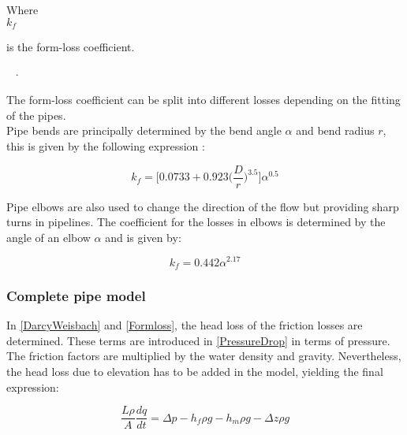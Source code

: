  \begin{minipage}[t]{0.20\textwidth}
Where\\
\hspace*{8mm} $k_f$ 
\end{minipage}
\begin{minipage}[t]{0.68\textwidth}
\vspace*{2mm}
is the form-loss coefficient.  
 \end{minipage}
\begin{minipage}[t]{0.10\textwidth}
\vspace*{2mm}
\textcolor{White}{te}$\unit{\cdot}$
\end{minipage}

The form-loss coefficient can be split into different losses depending on the 
fitting of the pipes. 
\\
Pipe bends are principally determined by the 
bend angle $\alpha$ and bend radius $r$, this is given by the following 
expression \cite{Design_Water}: 

\begin{equation}
  k_f = \bigg[0.0733 + 0.923 \bigg(\frac{D}{r}\bigg)^{3.5}\bigg]\alpha^{0.5}
  \label{kfriction}
\end{equation}

Pipe elbows are also used to change the direction of the flow but providing 
sharp turns in pipelines. The coefficient for the losses in elbows is determined by the angle of an elbow $\alpha$ and is given by:

\begin{equation}
  k_f = 0.442\alpha^{2.17}
\end{equation}

\subsubsection{Complete pipe model}
\label{CompletePipe}    %
In \eqref{DarcyWeisbach} and \eqref{Formloss}, the head loss of the friction losses are determined. These terms are introduced in \eqref{PressureDrop} in terms of pressure. The friction factors are multiplied by the water density and gravity. Nevertheless, the head loss due to elevation has to be added in the model, yielding the final expression:

\begin{equation}
   \frac{L \rho}{A} \frac{dq}{dt} =\Delta p - h_f \rho g - h_m \rho g - \Delta z \rho 
   g
\end{equation}

